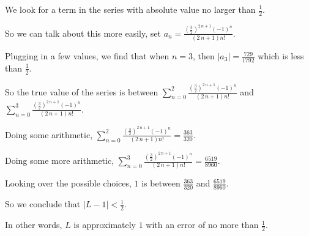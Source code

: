 \documentclass{ximera}
\begin{document}
\begin{question}
\begin{solution}
  \begin{hint}
    We look for a term in the series with absolute value no larger than \(\displaystyle\frac{1}{2}\).
  \end{hint}
  \begin{hint}
    So we can talk about this more easily, set \(a_{n} = \displaystyle\frac{\left(\displaystyle\frac{3}{2}\right)^{2 \, n + 1} \left(-1\right)^{n} }{ {\left(2 \, n + 1\right)} n!}\).
  \end{hint}
  \begin{hint}
    Plugging in a few values, we find that when \(n = 3\), then \(|a_{3}| = \displaystyle\frac{729}{1792}\) which is less than \(\displaystyle\frac{1}{2}\).
  \end{hint}
  \begin{hint}
    So the true value of the series is between \(\displaystyle\sum_{n = 0}^{2} \displaystyle\frac{\left(\displaystyle\frac{3}{2}\right)^{2 \, n + 1} \left(-1\right)^{n} }{ {\left(2 \, n + 1\right)} n!}\) and \(\displaystyle\sum_{n = 0}^{3} \displaystyle\frac{\left(\displaystyle\frac{3}{2}\right)^{2 \, n + 1} \left(-1\right)^{n} }{ {\left(2 \, n + 1\right)} n!}\).
  \end{hint}
  \begin{hint}
    Doing some arithmetic, \(\displaystyle\sum_{n = 0}^{2} \displaystyle\frac{\left(\displaystyle\frac{3}{2}\right)^{2 \, n + 1} \left(-1\right)^{n} }{ {\left(2 \, n + 1\right)} n!} = \displaystyle\frac{363}{320}\).
  \end{hint}
  \begin{hint}
    Doing some more arithmetic, \(\displaystyle\sum_{n = 0}^{3} \displaystyle\frac{\left(\displaystyle\frac{3}{2}\right)^{2 \, n + 1} \left(-1\right)^{n} }{ {\left(2 \, n + 1\right)} n!} = \displaystyle\frac{6519}{8960}\).
  \end{hint}
  \begin{hint}
    Looking over the possible choices, \(1\) is between \(\displaystyle\frac{363}{320}\) and \(\displaystyle\frac{6519}{8960}\).
  \end{hint}
  \begin{hint}
    So we conclude that \(\left| L - 1 \right| < \displaystyle\frac{1}{2}\).
  \end{hint}
  \begin{hint}
    In other words, \(L\) is approximately \(1\) with an error of no more than \(\displaystyle\frac{1}{2}\).
    
  \end{hint}
  
  \begin{multiple-choice}
  \end{multiple-choice}

\end{solution}
\end{question}
            
\end{document}
